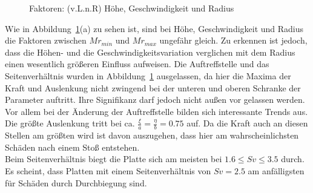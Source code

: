 \begin{figure}[H]%
	\centering
	\qquad
	\caption{Faktoren: (v.L.n.R) Höhe, Geschwindigkeit und Radius}%
	\label{fig:Faktoren}%
\end{figure}

Wie in Abbildung~\ref{fig:Faktoren}(a) zu sehen ist, sind bei Höhe, Geschwindigkeit und Radius die Faktoren zwischen $Mr_{min}$ und $Mr_{max}$ ungefähr gleich. Zu erkennen ist jedoch, dass die Höhen- und die Geschwindigkeitsvariation verglichen mit dem Radius einen wesentlich größeren Einfluss aufweisen.
Die Auftreffstelle und das Seitenverhältnis wurden in Abbildung~\ref{fig:Faktoren} ausgelassen, da hier die Maxima der Kraft und Auslenkung nicht zwingend bei der unteren und oberen Schranke der Parameter auftritt. Ihre Signifikanz darf jedoch nicht außen vor gelassen werden.\\
Vor allem bei der Änderung der Auftreffstelle bilden sich interessante Trends aus. Die größte Auslenkung tritt bei ca. $\frac{\xi}{a} = \frac{\eta}{b} = 0.75$ auf. Da die Kraft auch an diesen Stellen am größten wird ist davon auszugehen, dass hier am wahrscheinlichsten Schäden nach einem Stoß entstehen. \\
Beim Seitenverhältnis biegt die Platte sich am meisten bei $1.6 \leq Sv \leq 3.5$ durch. Es scheint, dass Platten mit einem Seitenverhältnis von $Sv = 2.5$ am anfälligsten für Schäden durch Durchbiegung sind.


